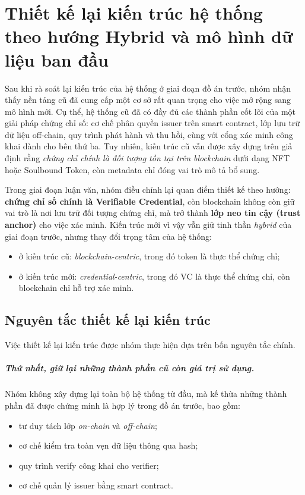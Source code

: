 \chapter{Thiết kế lại kiến trúc hệ thống theo hướng Hybrid và mô hình dữ liệu ban đầu}

Sau khi rà soát lại kiến trúc của hệ thống ở giai đoạn đồ án trước, nhóm nhận thấy nền tảng cũ đã cung cấp một cơ sở rất quan trọng cho việc mở rộng sang mô hình mới. Cụ thể, hệ thống cũ đã có đầy đủ các thành phần cốt lõi của một giải pháp chứng chỉ số: cơ chế phân quyền issuer trên smart contract, lớp lưu trữ dữ liệu off-chain, quy trình phát hành và thu hồi, cùng với cổng xác minh công khai dành cho bên thứ ba. Tuy nhiên, kiến trúc cũ vẫn được xây dựng trên giả định rằng \textit{chứng chỉ chính là đối tượng tồn tại trên blockchain} dưới dạng NFT hoặc Soulbound Token, còn metadata chỉ đóng vai trò mô tả bổ sung. \cite{erc721,erc5192}

Trong giai đoạn luận văn, nhóm điều chỉnh lại quan điểm thiết kế theo hướng: \textbf{chứng chỉ số chính là Verifiable Credential}, còn blockchain không còn giữ vai trò là nơi lưu trữ đối tượng chứng chỉ, mà trở thành \textbf{lớp neo tin cậy (trust anchor)} cho việc xác minh. Kiến trúc mới vì vậy vẫn giữ tinh thần \textit{hybrid} của giai đoạn trước, nhưng thay đổi trọng tâm của hệ thống:
\begin{itemize}
    \item ở kiến trúc cũ: \textit{blockchain-centric}, trong đó token là thực thể chứng chỉ;
    \item ở kiến trúc mới: \textit{credential-centric}, trong đó VC là thực thể chứng chỉ, còn blockchain chỉ hỗ trợ xác minh.
\end{itemize}

\section{Nguyên tắc thiết kế lại kiến trúc}

Việc thiết kế lại kiến trúc được nhóm thực hiện dựa trên bốn nguyên tắc chính.

\paragraph{Thứ nhất, giữ lại những thành phần cũ còn giá trị sử dụng.}
Nhóm không xây dựng lại toàn bộ hệ thống từ đầu, mà kế thừa những thành phần đã được chứng minh là hợp lý trong đồ án trước, bao gồm:
\begin{itemize}
    \item tư duy tách lớp \textit{on-chain} và \textit{off-chain};
    \item cơ chế kiểm tra toàn vẹn dữ liệu thông qua hash;
    \item quy trình verify công khai cho verifier;
    \item cơ chế quản lý issuer bằng smart contract.
\end{itemize}

